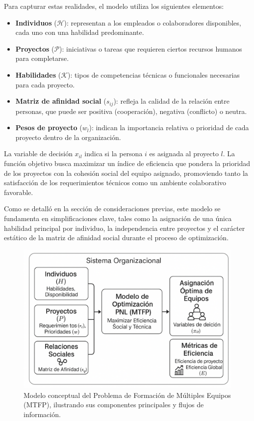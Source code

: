 \documentclass[conference]{IEEEtran}
\begin{document}
Para capturar estas realidades, el modelo utiliza los siguientes elementos:

\begin{itemize}
    \item \textbf{Individuos} (\(\mathcal{H}\)): representan a los empleados o colaboradores disponibles, cada uno con una habilidad predominante.
    \item \textbf{Proyectos} (\(\mathcal{P}\)): iniciativas o tareas que requieren ciertos recursos humanos para completarse.
    \item \textbf{Habilidades} (\(\mathcal{K}\)): tipos de competencias técnicas o funcionales necesarias para cada proyecto.
    \item \textbf{Matriz de afinidad social} (\(s_{ij}\)): refleja la calidad de la relación entre personas, que puede ser positiva (cooperación), negativa (conflicto) o neutra.
    \item \textbf{Pesos de proyecto} (\(w_l\)): indican la importancia relativa o prioridad de cada proyecto dentro de la organización.
\end{itemize}

La variable de decisión \(x_{il}\) indica si la persona \(i\) es asignada al proyecto \(l\). La función objetivo busca maximizar un índice de eficiencia que pondera la prioridad de los proyectos con la cohesión social del equipo asignado, promoviendo tanto la satisfacción de los requerimientos técnicos como un ambiente colaborativo favorable.

Como se detalló en la sección de consideraciones previas, este modelo se fundamenta en simplificaciones clave, tales como la asignación de una única habilidad principal por individuo, la independencia entre proyectos y el carácter estático de la matriz de afinidad social durante el proceso de optimización.

\begin{figure}[htbp]
    \centering
    \includegraphics[width=0.8\linewidth]{diagrama_conceptual_mtfp.png}
    \caption{Modelo conceptual del Problema de Formación de Múltiples Equipos (MTFP), ilustrando sus componentes principales y flujos de información.}
    \label{fig:conceptual_model}
\end{figure}
\end{document}
